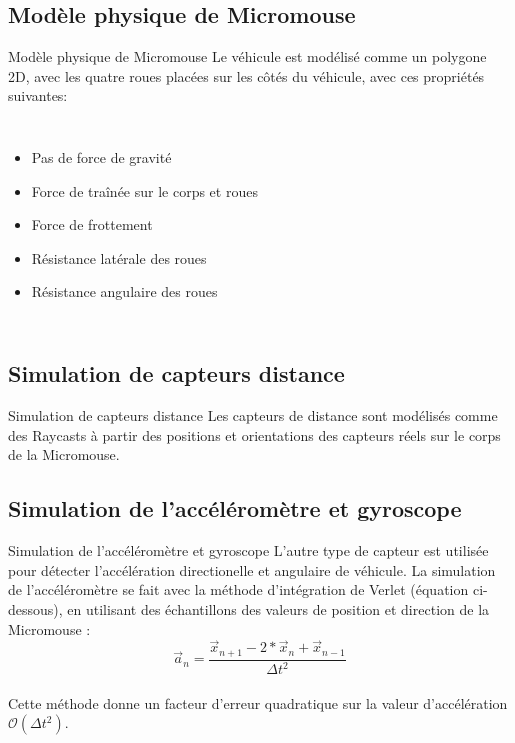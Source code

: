 \documentclass{beamer}
\begin{document}
\subsection{Modèle physique de Micromouse}
\begin{frame}{Modèle physique de Micromouse}
Le véhicule est modélisé comme un polygone 2D, avec les quatre roues placées sur les côtés du véhicule, avec ces propriétés suivantes:
\begin{columns}[c]
\begin{itemize}
    \item Pas de force de gravité
    \item Force de traînée sur le corps et roues
    \item Force de frottement
    \item Résistance latérale des roues
    \item Résistance angulaire des roues
\end{itemize}


\end{columns}
\end{frame}

\subsection{Simulation de capteurs distance}
\begin{frame}{Simulation de capteurs distance}
Les capteurs de distance sont modélisés comme des Raycasts à partir des positions et orientations des capteurs réels sur le corps de la Micromouse.

\end{frame}

\subsection{Simulation de l'accéléromètre et gyroscope}
\begin{frame}{Simulation de l'accéléromètre et gyroscope}
L'autre type de capteur est utilisée pour détecter l'accélération directionelle et angulaire de véhicule. 
La simulation de l'accéléromètre se fait avec la méthode d'intégration de Verlet (équation ci-dessous), en utilisant des échantillons des valeurs de position et direction de la Micromouse : \\
\begin{equation*}
    \vec{a}_n = \frac{\vec{x}_{n+1} - 2 * \vec{x}_n + \vec{x}_{n-1}}{\Delta t^2}
\end{equation*}\\
Cette méthode donne un facteur d'erreur quadratique sur la valeur d'accélération $\mathcal{O}(\Delta t^2)$.
\end{frame}
\end{document}
